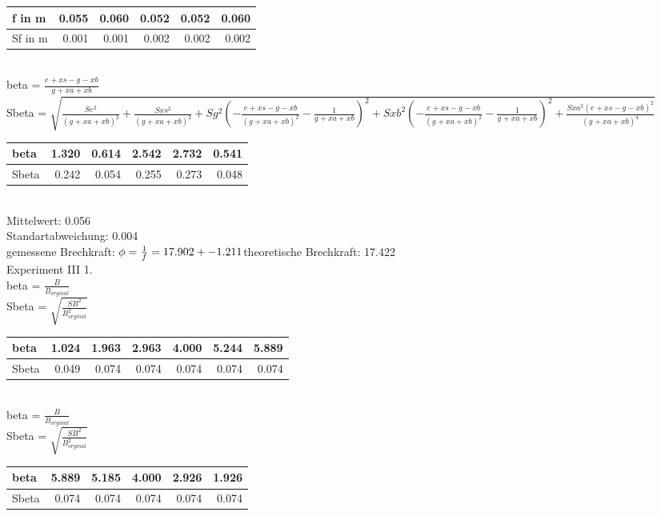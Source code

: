 	\begin{tabular}{| l | r|r|r|r|r|}
	\hline
        f in m& 0.055 & 0.060 & 0.052 & 0.052 & 0.060 \\ \hline Sf in m& 0.001 & 0.001 & 0.002 & 0.002 & 0.002 \\ \hline
	\end{tabular} \\ \bigskip \vspace{3 mm}  beta = $\frac{e_{} + xs - g_{} - xb}{g_{} + xa + xb}$\\Sbeta = $\sqrt{\frac{Se_{}^{2}}{\left(g_{} + xa + xb\right)^{2}} + \frac{Sxs^{2}}{\left(g_{} + xa + xb\right)^{2}} + Sg_{}^{2} \left(- \frac{e_{} + xs - g_{} - xb}{\left(g_{} + xa + xb\right)^{2}} - \frac{1}{g_{} + xa + xb}\right)^{2} + Sxb^{2} \left(- \frac{e_{} + xs - g_{} - xb}{\left(g_{} + xa + xb\right)^{2}} - \frac{1}{g_{} + xa + xb}\right)^{2} + \frac{Sxa^{2} \left(e_{} + xs - g_{} - xb\right)^{2}}{\left(g_{} + xa + xb\right)^{4}}}$\\\normalsize \vspace{3 mm}
	\begin{tabular}{| l | r|r|r|r|r|}
	\hline
        beta& 1.320 & 0.614 & 2.542 & 2.732 & 0.541 \\ \hline Sbeta& 0.242 & 0.054 & 0.255 & 0.273 & 0.048 \\ \hline
	\end{tabular} \\ \bigskip Mittelwert: 0.056\\Standartabweichung: 0.004\\gemessene Brechkraft: $\phi=\frac{1}{f}=17.902 +- 1.211\\ $theoretische Brechkraft: 17.422\\ Experiment III 1.\\ \vspace{3 mm}  beta = $\frac{B}{B_{orginal}}$\\Sbeta = $\sqrt{\frac{SB^{2}}{B_{orginal}^{2}}}$\\\normalsize \vspace{3 mm}
	\begin{tabular}{| l | r|r|r|r|r|r|}
	\hline
        beta& 1.024 & 1.963 & 2.963 & 4.000 & 5.244 & 5.889 \\ \hline Sbeta& 0.049 & 0.074 & 0.074 & 0.074 & 0.074 & 0.074 \\ \hline
	\end{tabular} \\ \bigskip \vspace{3 mm}  beta = $\frac{B}{B_{orginal}}$\\Sbeta = $\sqrt{\frac{SB^{2}}{B_{orginal}^{2}}}$\\\normalsize \vspace{3 mm}
	\begin{tabular}{| l | r|r|r|r|r|}
	\hline
        beta& 5.889 & 5.185 & 4.000 & 2.926 & 1.926 \\ \hline Sbeta& 0.074 & 0.074 & 0.074 & 0.074 & 0.074 \\ \hline
	\end{tabular} \\ \bigskip 
